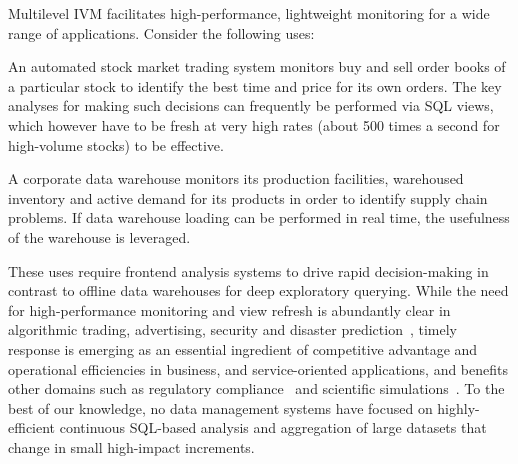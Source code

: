 
Multilevel IVM
facilitates high-performance, lightweight monitoring for a wide range of
applications. Consider the following uses:

\vspace{-2mm}
\begin{list}{}{ \leftmargin=1em}
\addtolength{\itemsep}{-0.5\baselineskip}
\item An automated stock market trading system monitors buy
and sell order books of a particular stock to identify the best time and price for
its own orders. The key analyses for making such decisions can frequently be performed via SQL views,
which however have to be fresh at very high rates (about 500 times a second for high-volume stocks)
to be effective.

\item A corporate data warehouse monitors its production facilities, warehoused
inventory and active demand for its products in order to identify
supply chain problems. If data warehouse loading can be performed in real time, the usefulness
of the warehouse is leveraged.
\end{list}

\vspace{-1mm}
These uses require frontend analysis systems to drive rapid decision-making in
contrast to offline data warehouses for deep exploratory querying.
%
%
While the need for
high-per\-for\-mance monitoring and view refresh is abundantly clear in algorithmic
trading, advertising, security and disaster prediction~\cite{scholz1973earthquake},
timely response is emerging as an essential ingredient of competitive advantage
and operational efficiencies in business, and service-oriented applications, and
benefits other domains such as regulatory compliance~\cite{basel2} and
scientific simulations~\cite{hey2009fourth}. To the best of our knowledge, no
data management systems have focused on highly-efficient continuous SQL-based analysis and aggregation
of large datasets that change in small high-impact increments.


